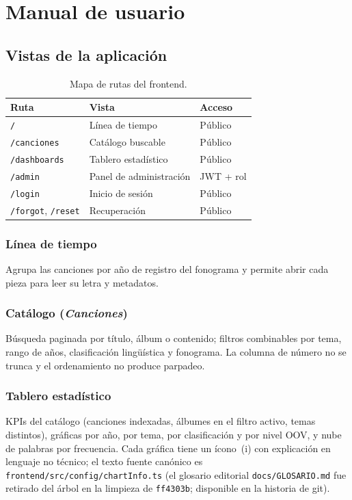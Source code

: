 \documentclass[11pt,letterpaper,twoside]{report}
\newcommand{\codigo}[1]{\texttt{#1}}
\begin{document}
\chapter{Manual de usuario}
\label{cap:usuario}

\section{Vistas de la aplicación}
\begin{table}[h]
  \centering
  \begin{tabular}{lll}
    \toprule
    \textbf{Ruta} & \textbf{Vista} & \textbf{Acceso} \\
    \midrule
    \codigo{/}          & Línea de tiempo   & Público \\
    \codigo{/canciones} & Catálogo buscable & Público \\
    \codigo{/dashboards}& Tablero estadístico & Público \\
    \codigo{/admin}     & Panel de administración & JWT + rol \\
    \codigo{/login}     & Inicio de sesión  & Público \\
    \codigo{/forgot}, \codigo{/reset} & Recuperación & Público \\
    \bottomrule
  \end{tabular}
  \caption{Mapa de rutas del frontend.}
  \label{tab:rutas}
\end{table}

\subsection{Línea de tiempo}
Agrupa las canciones por año de registro del fonograma y permite abrir
cada pieza para leer su letra y metadatos.

\subsection{Catálogo (\emph{Canciones})}
Búsqueda paginada por título, álbum o contenido; filtros combinables
por tema, rango de años, clasificación lingüística y fonograma. La
columna de número no se trunca y el ordenamiento no produce parpadeo.

\subsection{Tablero estadístico}
KPIs del catálogo (canciones indexadas, álbumes en el filtro activo,
temas distintos), gráficas por año, por tema, por clasificación y por
nivel OOV, y nube de palabras por frecuencia. Cada gráfica tiene un
ícono \raisebox{0pt}{$\circledast$}\,(i) con explicación en lenguaje no
técnico; el texto fuente canónico es
\codigo{frontend/src/config/chartInfo.ts} (el glosario editorial
\codigo{docs/GLOSARIO.md} fue retirado del árbol en la limpieza de
\codigo{ff4303b}; disponible en la historia de git).
\end{document}
